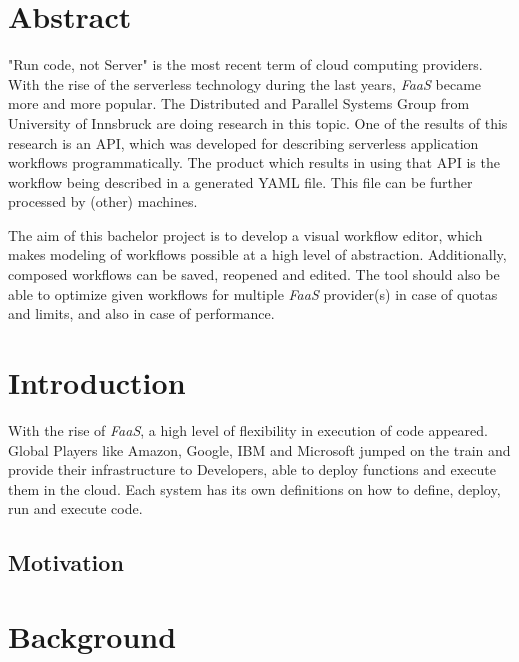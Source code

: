\documentclass[a4paper,11pt,pdftex,halfparskip,cleardoubleempty]{scrbook}
\begin{document}


\cleardoublepage



\cleardoublepage

\pagestyle{plain}

\section*{Abstract}
"Run code, not Server" is the most recent term of cloud computing providers.
With the rise of the serverless technology during the last years, \emph{FaaS} became more and more popular.
The Distributed and Parallel Systems Group from University of Innsbruck are doing research in this topic.
One of the results of this research is an API, which was developed for describing serverless application workflows programmatically.
The product which results in using that API is the workflow being described in a generated YAML file.
This file can be further processed by (other) machines.

The aim of this bachelor project is to develop a visual workflow editor, which makes modeling of workflows possible at a high level of abstraction. Additionally, composed workflows can be saved, reopened and edited. The tool should also be able to optimize  given workflows for multiple \emph{FaaS} provider(s) in case of quotas and limits, and also in case of performance.

\cleardoublepage

\tableofcontents

\newpage

\section{Introduction}

With the rise of \emph{FaaS}, a high level of flexibility in execution of code appeared. Global Players like Amazon, Google, IBM and Microsoft jumped on the train and provide their infrastructure to Developers, able to deploy functions and execute them in the cloud. Each system has its own definitions on how to define, deploy, run and execute code. 

\label{sec:introduction}
\subsection{Motivation}

\section{Background}
\end{document}
